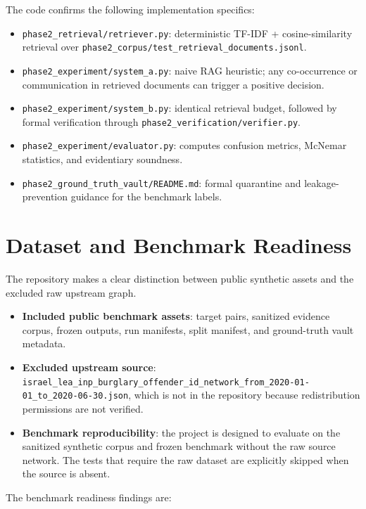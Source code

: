 \documentclass[11pt,a4paper]{article}
\begin{document}
The code confirms the following implementation specifics:

\begin{itemize}[leftmargin=1.5em]
  \item \texttt{phase2\_retrieval/retriever.py}: deterministic TF-IDF + cosine-similarity retrieval over \texttt{phase2\_corpus/test\_retrieval\_documents.jsonl}.
  \item \texttt{phase2\_experiment/system\_a.py}: naive RAG heuristic; any co-occurrence or communication in retrieved documents can trigger a positive decision.
  \item \texttt{phase2\_experiment/system\_b.py}: identical retrieval budget, followed by formal verification through \texttt{phase2\_verification/verifier.py}.
  \item \texttt{phase2\_experiment/evaluator.py}: computes confusion metrics, McNemar statistics, and evidentiary soundness.
  \item \texttt{phase2\_ground\_truth\_vault/README.md}: formal quarantine and leakage-prevention guidance for the benchmark labels.
\end{itemize}

\section{Dataset and Benchmark Readiness}

The repository makes a clear distinction between public synthetic assets and the excluded raw upstream graph.

\begin{itemize}[leftmargin=1.5em]
  \item \textbf{Included public benchmark assets}: target pairs, sanitized evidence corpus, frozen outputs, run manifests, split manifest, and ground-truth vault metadata.
  \item \textbf{Excluded upstream source}: \texttt{israel\_lea\_inp\_burglary\_offender\_id\_network\_from\_2020-01-01\_to\_2020-06-30.json}, which is not in the repository because redistribution permissions are not verified.
  \item \textbf{Benchmark reproducibility}: the project is designed to evaluate on the sanitized synthetic corpus and frozen benchmark without the raw source network. The tests that require the raw dataset are explicitly skipped when the source is absent.
\end{itemize}

The benchmark readiness findings are:
\end{document}
